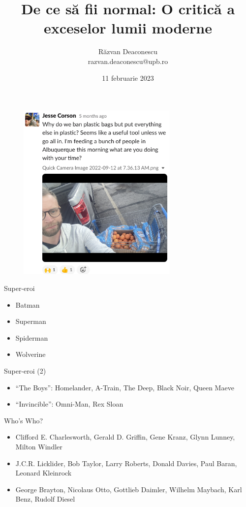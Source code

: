 \documentclass{simple}
\title[De ce să fii normal]{De ce să fii normal: O critică a exceselor lumii moderne}
\author[Răzvan Deaconescu]{Răzvan Deaconescu \\
razvan.deaconescu@upb.ro}
\date{11 februarie 2023}
\begin{document}
\frame{\titlepage}

\begin{frame}{}
  \begin{figure}
    \centering
    \includegraphics[width=0.7\textwidth]{img/plastic.png}
  \end{figure}
\end{frame}

\begin{frame}{Super-eroi}
  \begin{itemize}
    \pause \item Batman
    \pause \item Superman
    \pause \item Spiderman
    \pause \item Wolverine
  \end{itemize}
\end{frame}

\begin{frame}{Super-eroi (2)}
  \begin{itemize}
    \item ``The Boys'': Homelander, A-Train, The Deep, Black Noir, Queen Maeve
    \item ``Invincible'': Omni-Man, Rex Sloan
  \end{itemize}
\end{frame}

\begin{frame}{Who's Who?}
  \begin{itemize}
    \item Clifford E. Charlesworth, Gerald D. Griffin, Gene Kranz, Glynn Lunney, Milton Windler
    \item J.C.R. Licklider, Bob Taylor, Larry Roberts, Donald Davies, Paul Baran, Leonard Kleinrock
    \item George Brayton, Nicolaus Otto, Gottlieb Daimler, Wilhelm Maybach, Karl Benz, Rudolf Diesel
  \end{itemize}
\end{frame}
\end{document}
